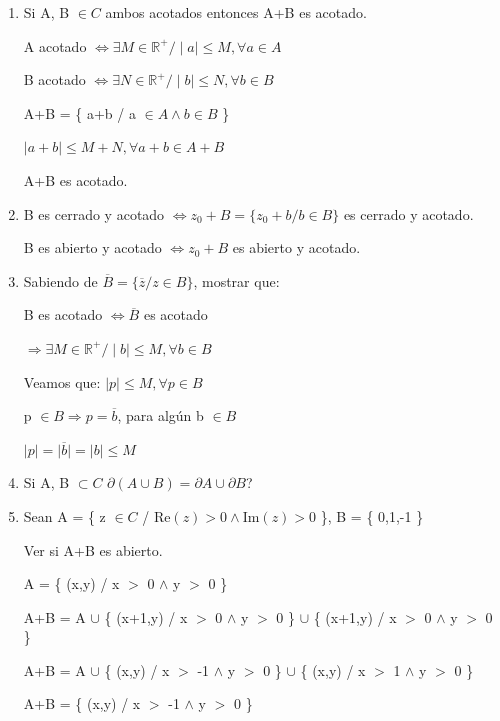 \documentclass[a4paper,12pt]{article}
\begin{document}
\begin{enumerate}
\begin{enumerate}
        \end{enumerate}


   \item Si A, B \(\in C\) ambos acotados entonces A+B es acotado.

A acotado \(\Leftrightarrow \exists M \in \mathbb{R}^+ / \mid a \mid \leq M, \forall a \in A\)

B acotado \(\Leftrightarrow \exists N \in \mathbb{R}^+ / \mid b \mid \leq N, \forall b \in B\)

A+B = \{ a+b / a \(\in A \wedge b \in B\) \}

\(\mid a+b \mid \leq M+N, \forall a+b \in A+B\)

A+B es acotado.

   \item B es cerrado y acotado \(\Leftrightarrow z_0 + B = \{ z_0 + b / b \in B \}\) es cerrado y acotado.

B es abierto y acotado \(\Leftrightarrow z_0 + B\) es abierto y acotado.

   \item Sabiendo de \(\overline{B} = \{ \overline{z} / z \in B \}\), mostrar que:

B es acotado \(\Leftrightarrow \overline{B}\) es acotado

\(\Rightarrow \exists M \in \mathbb{R}^+ / \mid b \mid \leq M, \forall b \in B\)

Veamos que: \(\mid p \mid \leq M, \forall p \in B\)

p \(\in B \Rightarrow p = \overline{b}\), para algún b \(\in B\)

\(\mid p \mid = \mid \overline{b} \mid = \mid b \mid \leq M\)

   \item Si A, B \(\subset C\) \(\partial(A \cup B) = \partial A \cup \partial B\)?

   \item Sean A = \{ z \(\in C\) / \(\text{Re}(z) > 0 \wedge \text{Im}(z) > 0\) \}, B = \{ 0,1,-1 \}

Ver si A+B es abierto.

A = \{ (x,y) / x \(>\) 0 \(\wedge\) y \(>\) 0 \}

A+B = A \(\cup\) \{ (x+1,y) / x \(>\) 0 \(\wedge\) y \(>\) 0 \} \(\cup\) \{ (x+1,y) / x \(>\) 0 \(\wedge\) y \(>\) 0 \}

A+B = A \(\cup\) \{ (x,y) / x \(>\) -1 \(\wedge\) y \(>\) 0 \} \(\cup\) \{ (x,y) / x \(>\) 1 \(\wedge\) y \(>\) 0 \}

A+B = \{ (x,y) / x \(>\) -1 \(\wedge\) y \(>\) 0 \}


\end{enumerate}
\end{document}
